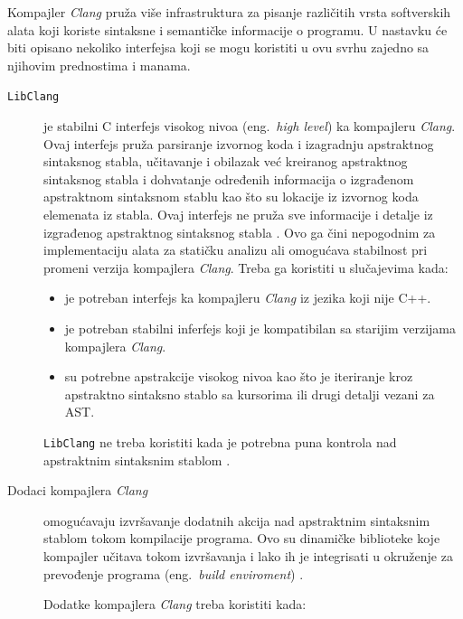 \documentclass[12pt,oneside]{memoir}
\begin{document}
 Kompajler \textit{Clang} pru\v{z}a vi\v{s}e infrastruktura za pisanje razli\v{c}itih vrsta softverskih alata koji koriste sintaksne i semanti\v{c}ke informacije o programu. U nastavku \'{c}e biti opisano nekoliko interfejsa koji se mogu koristiti u ovu svrhu zajedno sa njihovim prednostima i manama.


\begin{description}
\item[\texttt{LibClang}] je stabilni C interfejs visokog nivoa (eng.~\textit{high level}) ka kompajleru \textit{Clang}. Ovaj interfejs pru\v{z}a parsiranje izvornog koda
i izagradnju apstraktnog sintaksnog stabla, u\v{c}itavanje i obilazak ve\'{c} kreiranog apstraktnog sintaksnog stabla i dohvatanje određenih informacija o izgrađenom apstraktnom sintaksnom stablu kao \v{s}to su lokacije iz izvornog koda elemenata iz stabla. Ovaj interfejs ne pru\v{z}a sve informacije i detalje iz izgrađenog apstraktnog sintaksnog stabla \cite{LibClang}. Ovo ga \v{c}ini nepogodnim za implementaciju alata za stati\v{c}ku analizu ali omogu\'{c}ava stabilnost pri promeni verzija kompajlera \textit{Clang}.
Treba ga koristiti u slu\v{c}ajevima kada:
\begin{itemize}
  \item je potreban interfejs ka kompajleru \textit{Clang} iz jezika koji nije C++.
  \item je potreban stabilni inferfejs koji je kompatibilan sa starijim verzijama kompajlera \textit{Clang}.
  \item su potrebne apstrakcije visokog nivoa kao \v{s}to je iteriranje kroz apstraktno sintaksno stablo sa kursorima ili drugi detalji vezani za AST.
\end{itemize}
\texttt{LibClang} ne treba koristiti kada je potrebna puna kontrola nad apstraktnim sintaksnim stablom \cite{RightInterface}.

\item[Dodaci kompajlera \textit{Clang}] omogu\'{c}avaju izvr\v{s}avanje dodatnih akcija nad apstraktnim sintaksnim stablom tokom kompilacije programa. 
Ovo su dinami\v{c}ke biblioteke koje kompajler u\v{c}itava tokom izvr\v{s}avanja i lako ih je integrisati u okru\v{z}enje za prevođenje programa (eng.~\textit{build enviroment}) \cite{ClangPlugins}.

Dodatke kompajlera \textit{Clang} treba koristiti kada:


\end{description}
\end{document}
